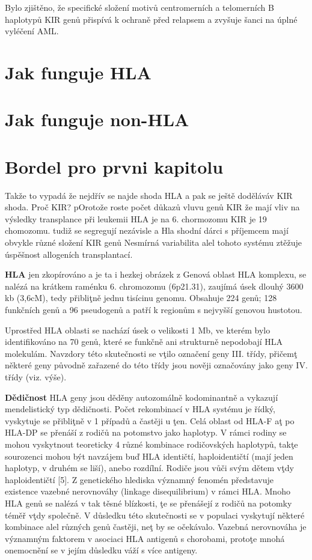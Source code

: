 \documentclass[czech,DP]{thesiskiv}
\begin{document}
Bylo zjištěno, že
specifické složení motivů centromerních a telomerních B haplotypů KIR genů přispívá
k ochraně před relapsem a zvyšuje šanci na úplné vyléčení AML.





\section{Jak funguje HLA}
\section{Jak funguje non-HLA}

\section{Bordel pro prvni kapitolu}
Takže to vypadá že nejdřív se najde shoda HLA a pak se ještě doděláváv KIR shoda.
Proč KIR? pOrotože roste počet důkazů vluvu genů KIR že mají vliv na výsledky transplance  při leukemii
HLA je na 6. chormozomu KIR je 19 chomozomu. tudiž se segregují nezávisle a Hla shodní dárci s příjemcem mají obvykle různé složení KIR genů
Nesmírná variabilita alel tohoto systému ztěžuje úspěšnost allogeních transplantací. 

\textbf{HLA}
jen zkopírováno a je ta i hezkej obrázek z %
Genová oblast HLA komplexu, se nalézá na krátkem raménku 6. chromozomu (6p21.31), zaujímá úsek dlouhý 3600 kb
(3,6cM), tedy přibliţně jednu tisícinu genomu. Obsahuje 224 genů; 128 funkčních genů
a 96 pseudogenů a patří k regionům s nejvyšší genovou hustotou.

Uprostřed HLA oblasti se nachází úsek o velikosti 1 Mb, ve kterém bylo identifikováno na
70 genů, které se funkčně ani strukturně nepodobají HLA molekulám. Navzdory této
skutečnosti se vţilo označení geny III. třídy, přičemţ některé geny původně zařazené do
této třídy jsou nověji označovány jako geny IV. třídy (viz. výše).


\textbf{Dědičnost}
HLA geny jsou děděny autozomálně kodominantně a vykazují mendelistický typ
dědičnosti. Počet rekombinací v HLA systému je řídký, vyskytuje se přibliţně v 1 %
případů a častěji u ţen. Celá oblast od HLA-F aţ po HLA-DP se přenáší z rodičů na
potomstvo jako haplotyp. V rámci rodiny se mohou vyskytnout teoreticky 4 různé
kombinace rodičovských haplotypů, takţe sourozenci mohou být navzájem buď HLA
identičtí, haploidentičtí (mají jeden haplotyp, v druhém se liší), anebo rozdílní. Rodiče jsou
vůči svým dětem vţdy haploidentičtí [5]. Z genetického hlediska významný fenomén
představuje existence vazebné nerovnováhy (linkage disequilibrium) v rámci HLA. Mnoho
HLA genů se nalézá v tak těsné blízkosti, ţe se přenášejí z rodičů na potomky téměř vţdy
společně. V důsledku této skutečnosti se v populaci vyskytují některé kombinace alel
různých genů častěji, neţ by se očekávalo. Vazebná nerovnováha je významným faktorem
v asociaci HLA antigenů s chorobami, protoţe mnohá onemocnění se v jejím důsledku
váží s více antigeny.
\end{document}
